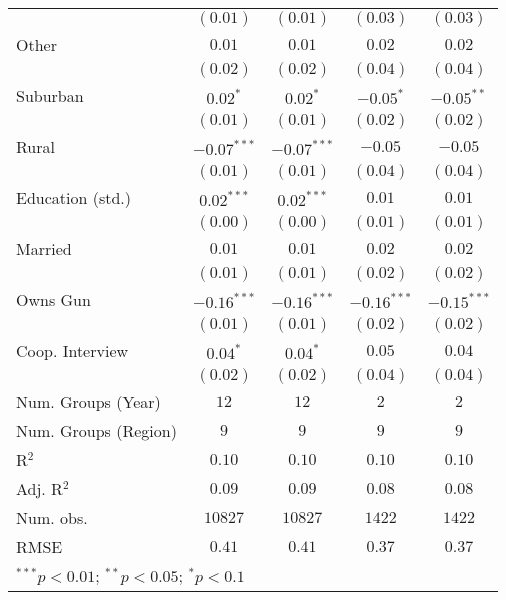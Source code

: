 \begin{table}
\begin{center}
\begin{tabular}{l c c c c}
                        & $(0.01)$      & $(0.01)$      & $(0.03)$      & $(0.03)$      \\
Other                   & $0.01$        & $0.01$        & $0.02$        & $0.02$        \\
                        & $(0.02)$      & $(0.02)$      & $(0.04)$      & $(0.04)$      \\
Suburban                & $0.02^{*}$    & $0.02^{*}$    & $-0.05^{*}$   & $-0.05^{**}$  \\
                        & $(0.01)$      & $(0.01)$      & $(0.02)$      & $(0.02)$      \\
Rural                   & $-0.07^{***}$ & $-0.07^{***}$ & $-0.05$       & $-0.05$       \\
                        & $(0.01)$      & $(0.01)$      & $(0.04)$      & $(0.04)$      \\
Education (std.)        & $0.02^{***}$  & $0.02^{***}$  & $0.01$        & $0.01$        \\
                        & $(0.00)$      & $(0.00)$      & $(0.01)$      & $(0.01)$      \\
Married                 & $0.01$        & $0.01$        & $0.02$        & $0.02$        \\
                        & $(0.01)$      & $(0.01)$      & $(0.02)$      & $(0.02)$      \\
Owns Gun                & $-0.16^{***}$ & $-0.16^{***}$ & $-0.16^{***}$ & $-0.15^{***}$ \\
                        & $(0.01)$      & $(0.01)$      & $(0.02)$      & $(0.02)$      \\
Coop. Interview         & $0.04^{*}$    & $0.04^{*}$    & $0.05$        & $0.04$        \\
                        & $(0.02)$      & $(0.02)$      & $(0.04)$      & $(0.04)$      \\
\midrule
Num. Groups (Year)      & $12$          & $12$          & $2$           & $2$           \\
Num. Groups (Region)    & $9$           & $9$           & $9$           & $9$           \\
R$^2$                   & $0.10$        & $0.10$        & $0.10$        & $0.10$        \\
Adj. R$^2$              & $0.09$        & $0.09$        & $0.08$        & $0.08$        \\
Num. obs.               & $10827$       & $10827$       & $1422$        & $1422$        \\
RMSE                    & $0.41$        & $0.41$        & $0.37$        & $0.37$        \\
\bottomrule
\multicolumn{5}{l}{\scriptsize{$^{***}p<0.01$; $^{**}p<0.05$; $^{*}p<0.1$}}
\end{tabular}
\label{table_school_region}
\end{center}
\end{table}

